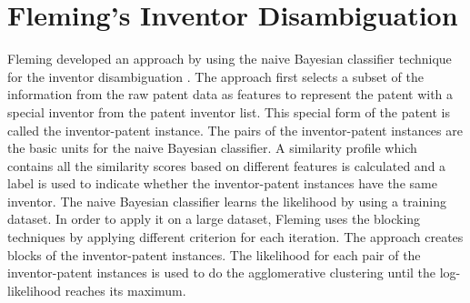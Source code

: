 \section{Fleming's Inventor Disambiguation}
Fleming developed an approach by using the naive Bayesian classifier technique for the inventor disambiguation \cite{RePEc:eee:respol:v:43:y:2014:i:6:p:941-955}. The approach first selects a subset of the information from the raw patent data as features to represent the patent with a special inventor from the patent inventor list. This special form of the patent is called the inventor-patent instance. The pairs of the inventor-patent instances are the basic units for the naive Bayesian classifier. A similarity profile which contains all the similarity scores based on different features is calculated and a label is used to indicate whether the inventor-patent instances have the same inventor. The naive Bayesian classifier learns the likelihood by using a training dataset. In order to apply it on a large dataset, Fleming uses the blocking techniques by applying different criterion for each iteration. The approach creates blocks of the inventor-patent instances. The likelihood for each pair of the inventor-patent instances is used to do the agglomerative clustering until the log-likelihood reaches its maximum. 

